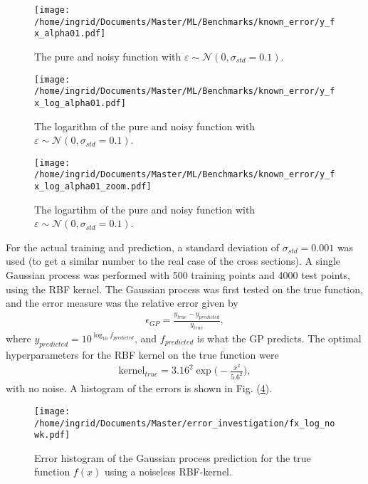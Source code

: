 \documentclass[twoside,english]{uiofysmaster}
\begin{document}
\begin{figure}
\centering
\texttt{[image: /home/ingrid/Documents/Master/ML/Benchmarks/known\_error/y\_fx\_alpha01.pdf]}
\caption{The pure and noisy function with $\varepsilon \sim \mathcal{N} (0, \sigma_{std} = 0.1)$.}
\label{Fig:: y and fx}
\end{figure} 

\begin{figure}
\centering
\texttt{[image: /home/ingrid/Documents/Master/ML/Benchmarks/known\_error/y\_fx\_log\_alpha01.pdf]}
\caption{The logarithm of the pure and noisy function with $\varepsilon \sim \mathcal{N} (0, \sigma_{std} = 0.1)$.}
\label{Fig:: log y and log fx}
\end{figure} 

\begin{figure}
\centering
\texttt{[image: /home/ingrid/Documents/Master/ML/Benchmarks/known\_error/y\_fx\_log\_alpha01\_zoom.pdf]}
\caption{The logartihm of the pure and noisy function with $\varepsilon \sim \mathcal{N} (0, \sigma_{std} = 0.1)$.}
\label{Fig:: log y and log fx zoom}
\end{figure} 

For the actual training and prediction, a standard deviation of $\sigma_{std} = 0.001$ was used (to get a similar number to the real case of the cross sections). A single Gaussian process was performed with 500 training points and 4000 test points, using the RBF kernel. The Gaussian process was first tested on the true function, and the error measure was the relative error given by
\begin{align}
\epsilon_{GP} = \frac{y_{true} - y_{predicted}}{y_{true}},
\end{align}
where $y_{predicted} = 10^{\log_{10} f_{predicted}}$, and $f_{predicted}$ is what the GP predicts. The optimal hyperparameters for the RBF kernel on the true function were
\begin{align*}
\text{kernel}_{true} = 3.16^2 \exp \Big( - \frac{x^2}{5.6^2} \Big),
\end{align*}
with no noise. A histogram of the errors is shown in Fig. (\ref{Fig:: fx prediction no noise}).

\begin{figure}
\centering
\texttt{[image: /home/ingrid/Documents/Master/error\_investigation/fx\_log\_nowk.pdf]}
\caption{Error histogram of the Gaussian process prediction for the true function $f(x)$ using a noiseless RBF-kernel.}
\label{Fig:: fx prediction no noise}
\end{figure}
\end{document}
